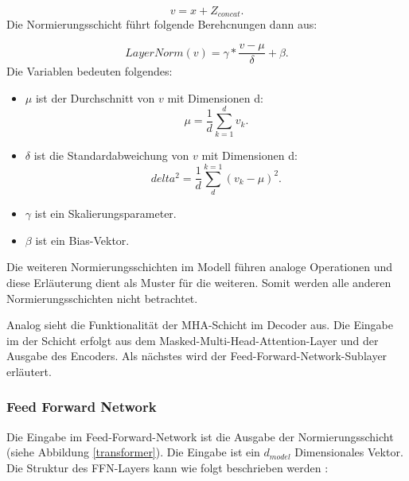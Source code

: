 \begin{equation}
	v = x + Z_{concat}.
\end{equation}
Die Normierungsschicht führt folgende Berehcnungen dann aus:

\begin{equation}
	LayerNorm(v) = \gamma * \frac{v - \mu}{\delta} + \beta.
\end{equation}
Die Variablen bedeuten folgendes:

\begin{itemize}[leftmargin=1cm]
		\item $\mu$ ist der Durchschnitt von $v$ mit Dimensionen d:
		\begin{equation}
			\mu = \frac{1}{d}\sum_{k=1}^{d} v_k.
		\end{equation}
		\item $\delta$ ist die Standardabweichung von $v$ mit Dimensionen d:
		\begin{equation}
			delta^2 = \frac{1}{d}\sum_{d}^{k=1} (v_k - \mu)^2.
		\end{equation}
		\item $\gamma$ ist ein Skalierungsparameter.
		\item $\beta$ ist ein Bias-Vektor.
\end{itemize}

Die weiteren Normierungsschichten im Modell führen analoge Operationen und diese Erläuterung dient als Muster für die weiteren. Somit werden alle anderen Normierungsschichten nicht betrachtet.

Analog sieht die Funktionalität der MHA-Schicht im Decoder aus. Die Eingabe im der Schicht erfolgt aus dem Masked-Multi-Head-Attention-Layer und der Ausgabe des Encoders. Als nächstes wird der Feed-Forward-Network-Sublayer erläutert.

\subsubsection{Feed Forward Network}

Die Eingabe im Feed-Forward-Network ist die Ausgabe der Normierungsschicht (siehe Abbildung \ref{transformer}). Die Eingabe ist ein $d_{model}$ Dimensionales Vektor. Die Struktur des FFN-Layers kann wie folgt beschrieben werden \cite{Vaswani:2017}:

